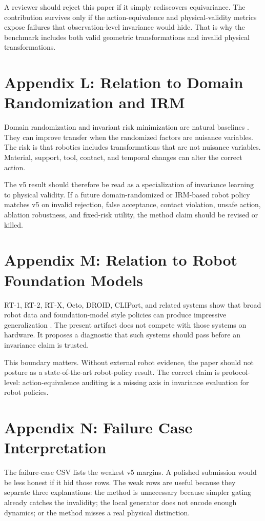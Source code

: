 \documentclass{article}
\begin{document}
A reviewer should reject this paper if it simply rediscovers equivariance. The contribution survives only if the action-equivalence and physical-validity metrics expose failures that observation-level invariance would hide. That is why the benchmark includes both valid geometric transformations and invalid physical transformations.


\section{Appendix L: Relation to Domain Randomization and IRM}
Domain randomization and invariant risk minimization are natural baselines \citep{octo2024,shridhar2022cliport,james2020rlbench,yu2020metaworld,ebert2021bridge}. They can improve transfer when the randomized factors are nuisance variables. The risk is that robotics includes transformations that are not nuisance variables. Material, support, tool, contact, and temporal changes can alter the correct action.

The v5 result should therefore be read as a specialization of invariance learning to physical validity. If a future domain-randomized or IRM-based robot policy matches v5 on invalid rejection, false acceptance, contact violation, unsafe action, ablation robustness, and fixed-risk utility, the method claim should be revised or killed.


\section{Appendix M: Relation to Robot Foundation Models}
RT-1, RT-2, RT-X, Octo, DROID, CLIPort, and related systems show that broad robot data and foundation-model style policies can produce impressive generalization \citep{cohen2016group,tobin2017domain,arjovsky2019invariant,zeng2020transporter,mandlekar2021robomimic,angelopoulos2021conformal}. The present artifact does not compete with those systems on hardware. It proposes a diagnostic that such systems should pass before an invariance claim is trusted.

This boundary matters. Without external robot evidence, the paper should not posture as a state-of-the-art robot-policy result. The correct claim is protocol-level: action-equivalence auditing is a missing axis in invariance evaluation for robot policies.


\section{Appendix N: Failure Case Interpretation}
The failure-case CSV lists the weakest v5 margins. A polished submission would be less honest if it hid those rows. The weak rows are useful because they separate three explanations: the method is unnecessary because simpler gating already catches the invalidity; the local generator does not encode enough dynamics; or the method misses a real physical distinction.
\end{document}
